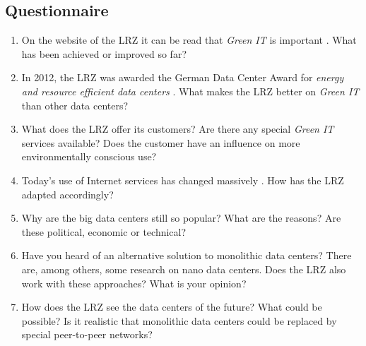 \documentclass[sigchi-a, authorversion]{acmart}
\begin{document}
\nocite{*}



\begin{appendices}
\chapter{Questionnaire}
\begin{enumerate}
\item On the website of the LRZ it can be read that \textit{Green IT} is important \cite{LRZGreenIT}. What has been achieved or improved so far?
\item In 2012, the LRZ was awarded the German Data Center Award for \textit{energy and resource efficient data centers} \cite{LRZGreenIT}. What makes the LRZ better on \textit{Green IT} than other data centers?
\item What does the LRZ offer its customers? Are there any special \textit{Green IT} services available? Does the customer have an influence on more environmentally conscious use?
\item Today's use of Internet services has changed massively \cite{TheZetta68:online}. How has the LRZ adapted accordingly?
\item Why are the big data centers still so popular? What are the reasons? Are these political, economic or technical?
\item Have you heard of an alternative solution to monolithic data centers? There are, among others, some research on nano data centers. Does the LRZ also work with these approaches? What is your opinion?
\item How does the LRZ see the data centers of the future? What could be possible? Is it realistic that monolithic data centers could be replaced by special peer-to-peer networks?
\end{enumerate}
\end{appendices}
\end{document}
